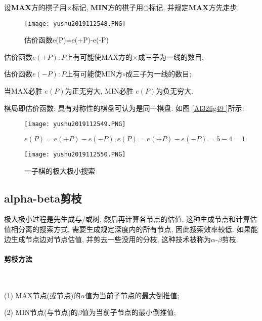 设\textbf{MAX}方的棋子用$\times$标记, \textbf{MIN}方的棋子用$○$标记, 并规定\textbf{MAX}方先走步.
\begin{figure}[H]
    \centering
    \texttt{[image: yushu2019112548.PNG]}
    \caption{估价函数e(P)=e(+P)-e(-P)}
    \label{AI32fig48}
\end{figure}
\begin{result}

估价函数$e(+P): P$上有可能使{MAX}方的$\times$成三子为一线的数目;

估价函数$e(-P): P$上有可能使{MIN}方$\circ$成三子为一线的数目;

当\textup{MAX}必胜 $e(P)$为正无穷大, \textup{MIN}必胜 $e(P)$为负无穷大.

棋局即估价函数: 具有对称性的棋盘可认为是同一棋盘. 如图 \ref{AI32fig49 }所示:
\begin{figure}[H]
    \centering
    \texttt{[image: yushu2019112549.PNG]}
    \caption{$e(P)=e(+P)-e(-P), e(P)=e(+P)-e(-P)=5-4=1.$}
    \label{AI32fig49}
\end{figure}
\end{result}
\begin{figure}[H]
    \centering
    \texttt{[image: yushu2019112550.PNG]}
    \vspace{-0.5cm}
    \caption{一子棋的极大极小搜索}
    \label{AI32fig50}
\end{figure}
\subsection{alpha-beta剪枝}
极大极小过程是先生成与/或树, 然后再计算各节点的估值, 这种生成节点和计算估值相分离的搜索方式, 需要生成规定深度内的所有节点, 因此搜索效率较低.
如果能边生成节点边对节点估值, 并剪去一些没用的分枝, 这种技术被称为$\alpha$-$\beta$剪枝.
\paragraph{剪枝方法}~{}

(1) \textup{MAX}节点(或节点)的$\alpha$值为当前子节点的最大倒推值;

(2) \textup{MIN}节点(与节点)的$\beta$值为当前子节点的最小倒推值;

